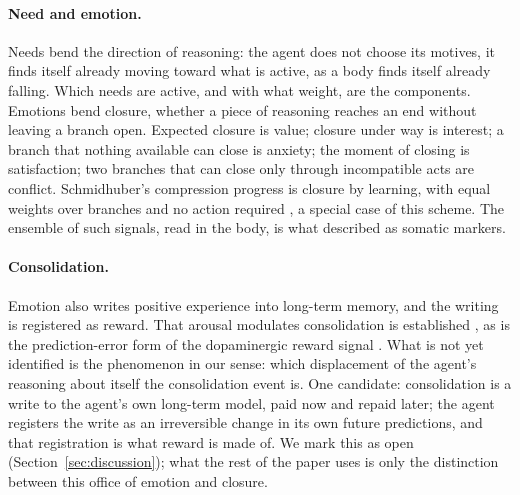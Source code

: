 
\paragraph{Need and emotion.}
\label{sec:need}
Needs bend the direction of reasoning: the agent does not choose its motives, it finds itself already
moving toward what is active, as a body finds itself already falling. Which needs are active, and with
what weight, are the components. Emotions bend closure, whether a piece of reasoning reaches an end
without leaving a branch open. Expected closure is value; closure under way is interest; a branch that
nothing available can close is anxiety; the moment of closing is satisfaction; two branches that can
close only through incompatible acts are conflict. Schmidhuber's compression progress is closure by
learning, with equal weights over branches and no action required \citep{schmidhuber2010}, a special
case of this scheme. The ensemble of such signals, read in the body, is what \citet{damasio1996}
described as somatic markers.

\paragraph{Consolidation.}
\label{sec:consolidation}
Emotion also writes positive experience into long-term memory, and the writing is registered as reward.
That arousal modulates consolidation is established \citep{cahill1998,mcgaugh2000}, as is the
prediction-error form of the dopaminergic reward signal \citep{schultz1997}. What is not yet identified
is the phenomenon in our sense: which displacement of the agent's reasoning about itself the
consolidation event is. One candidate: consolidation is a write to the agent's own long-term model,
paid now and repaid later; the agent registers the write as an irreversible change in its own future
predictions, and that registration is what reward is made of. We mark this as open
(Section~\ref{sec:discussion}); what the rest of the paper uses is only the distinction between this
office of emotion and closure.

